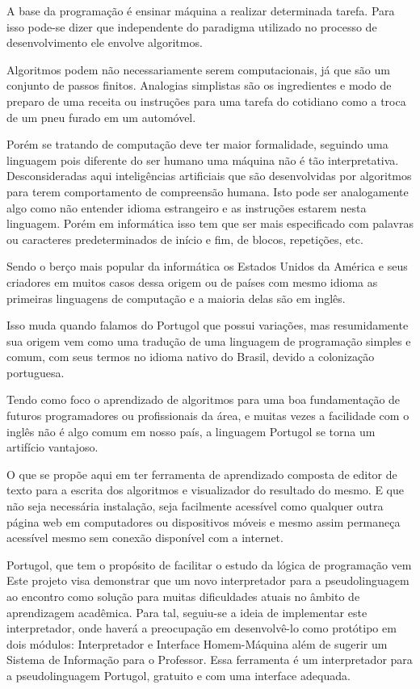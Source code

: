 A base da programação é ensinar máquina a realizar determinada tarefa. Para isso
pode-se dizer que independente do paradigma utilizado no processo de
desenvolvimento ele envolve algoritmos.

Algoritmos podem não necessariamente serem computacionais, já que são um
conjunto de passos finitos. Analogias simplistas são os ingredientes e modo de
preparo de uma receita ou instruções para uma tarefa do cotidiano como a troca
de um pneu furado em um automóvel.

Porém se tratando de computação deve ter maior formalidade, seguindo uma linguagem
pois diferente do ser humano uma máquina não é tão interpretativa.
Desconsideradas aqui inteligências artificiais que são desenvolvidas por
algoritmos para terem  comportamento de compreensão humana. Isto pode ser
analogamente algo como não entender idioma estrangeiro e as instruções estarem
nesta linguagem. Porém em informática isso tem que ser mais especificado com
palavras ou caracteres predeterminados de início e fim, de blocos, repetições,
etc.

Sendo o berço mais popular da informática os Estados Unidos da América e seus
criadores em muitos casos dessa origem ou de países com mesmo idioma as
primeiras linguagens de computação e a maioria delas são em inglês.

Isso muda quando falamos do Portugol que possui variações, mas resumidamente
sua origem vem como uma tradução de uma linguagem de programação simples e comum,
com seus termos no idioma nativo do Brasil, devido a colonização
portuguesa.

Tendo como foco o aprendizado de algoritmos para uma boa fundamentação de
futuros programadores ou profissionais da área, e muitas vezes a facilidade com
o inglês não é algo comum em nosso país, a linguagem Portugol se torna um
artifício vantajoso.

O que se propõe aqui em ter ferramenta de aprendizado composta de editor de
texto para a escrita dos algoritmos e visualizador do resultado do mesmo.
E que não seja necessária instalação, seja facilmente acessível como qualquer
outra página web em computadores ou dispositivos móveis e mesmo assim permaneça
acessível mesmo sem conexão disponível com a internet.

Portugol, que tem o propósito de facilitar o estudo da lógica de programação vem
Este projeto visa demonstrar que um novo interpretador para a pseudolinguagem
ao encontro como solução para muitas dificuldades atuais no âmbito de
aprendizagem acadêmica. Para tal, seguiu-se a ideia de implementar este
interpretador, onde haverá a preocupação em desenvolvê-lo como protótipo em dois
módulos: Interpretador e Interface Homem-Máquina além de sugerir um Sistema de
Informação para o Professor. Essa ferramenta é um interpretador para a
pseudolinguagem Portugol, gratuito e com uma interface adequada.
